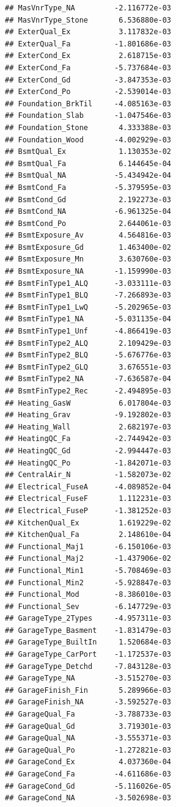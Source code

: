 \documentclass[
]{article}
\begin{document}
\begin{verbatim}
## MasVnrType_NA         -2.116772e-03
## MasVnrType_Stone       6.536880e-03
## ExterQual_Ex           3.117832e-03
## ExterQual_Fa          -1.801686e-03
## ExterCond_Ex           2.618715e-03
## ExterCond_Fa          -5.737684e-03
## ExterCond_Gd          -3.847353e-03
## ExterCond_Po          -2.539014e-03
## Foundation_BrkTil     -4.085163e-03
## Foundation_Slab       -1.047546e-03
## Foundation_Stone       4.333388e-03
## Foundation_Wood       -4.002929e-03
## BsmtQual_Ex            1.130353e-02
## BsmtQual_Fa            6.144645e-04
## BsmtQual_NA           -5.434942e-04
## BsmtCond_Fa           -5.379595e-03
## BsmtCond_Gd            2.192273e-03
## BsmtCond_NA           -6.961325e-04
## BsmtCond_Po            2.644061e-03
## BsmtExposure_Av        4.564816e-03
## BsmtExposure_Gd        1.463400e-02
## BsmtExposure_Mn        3.630760e-03
## BsmtExposure_NA       -1.159990e-03
## BsmtFinType1_ALQ      -3.033111e-03
## BsmtFinType1_BLQ      -7.266893e-03
## BsmtFinType1_LwQ      -5.202965e-03
## BsmtFinType1_NA       -5.031135e-04
## BsmtFinType1_Unf      -4.866419e-03
## BsmtFinType2_ALQ       2.109429e-03
## BsmtFinType2_BLQ      -5.676776e-03
## BsmtFinType2_GLQ       3.676551e-03
## BsmtFinType2_NA       -7.636587e-04
## BsmtFinType2_Rec      -2.494895e-03
## Heating_GasW           6.017804e-03
## Heating_Grav          -9.192802e-03
## Heating_Wall           2.682197e-03
## HeatingQC_Fa          -2.744942e-03
## HeatingQC_Gd          -2.994447e-03
## HeatingQC_Po          -1.842071e-03
## CentralAir_N          -1.582073e-02
## Electrical_FuseA      -4.089852e-04
## Electrical_FuseF       1.112231e-03
## Electrical_FuseP      -1.381252e-03
## KitchenQual_Ex         1.619229e-02
## KitchenQual_Fa         2.148610e-04
## Functional_Maj1       -6.150106e-03
## Functional_Maj2       -1.437906e-02
## Functional_Min1       -5.708469e-03
## Functional_Min2       -5.928847e-03
## Functional_Mod        -8.386010e-03
## Functional_Sev        -6.147729e-03
## GarageType_2Types     -4.957311e-03
## GarageType_Basment    -1.831479e-03
## GarageType_BuiltIn     1.520684e-03
## GarageType_CarPort    -1.172537e-03
## GarageType_Detchd     -7.843128e-03
## GarageType_NA         -3.515270e-03
## GarageFinish_Fin       5.289966e-03
## GarageFinish_NA       -3.592527e-03
## GarageQual_Fa         -3.788733e-03
## GarageQual_Gd          3.719301e-03
## GarageQual_NA         -3.555371e-03
## GarageQual_Po         -1.272821e-03
## GarageCond_Ex          4.037360e-04
## GarageCond_Fa         -4.611686e-03
## GarageCond_Gd         -5.116026e-05
## GarageCond_NA         -3.502698e-03

\end{verbatim}
\end{document}
